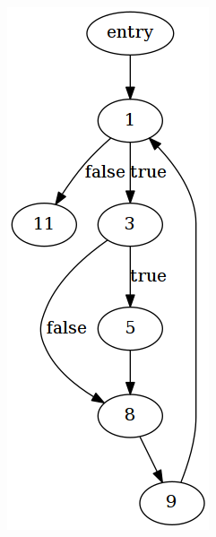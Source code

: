 \begin{figure}[htbp]
	\centering
	\begin{subfigure}[ht]{0.38\textwidth}
		
	\end{subfigure}
	\qquad
	\begin{subfigure}[ht]{0.20\textwidth}
		\includegraphics[width=\textwidth]{inc/appendices/ll2dot_example/example1_graphs/main.png}

\end{subfigure}
\end{figure}
